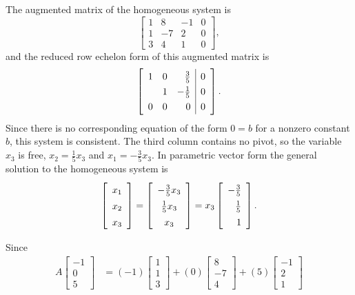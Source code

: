 \begin{example}
\ea 

\ExampleSolution
\ba
\item The augmented matrix of the homogeneous system is 
\[ \left[ \begin{array}{crr|c} 1&8&-1&0 \\ 1&-7&2&0 \\ 3&4&1&0 \end{array} \right],\]
and the reduced row echelon form of this augmented matrix is 
\[ \left[ \renewcommand{\arraystretch}{1.3} \begin{array}{ccr|c} 1&0&\frac{3}{5}&0 \\ &1&-\frac{1}{5}&0 \\ 0&0&0&0 \end{array} \right].\]
Since there is no corresponding equation of the form $0 = b$ for a nonzero constant $b$, this system is consistent. The third column contains no pivot, so the variable $x_3$ is free, $x_2 = \frac{1}{5}x_3$ and $x_1 =  -\frac{3}{5}x_3$.
In parametric vector form the general solution to the homogeneous system is 
\[\left[\begin{array}{c} x_1\\x_2\\x_3 \end{array} \right] = \left[\renewcommand{\arraystretch}{1.4} \begin{array}{c} -\frac{3}{5}x_3\\ \frac{1}{5}x_3\\x_3 \end{array} \right]  = x_3 \left[\renewcommand{\arraystretch}{1.4} \begin{array}{r} -\frac{3}{5}\\ \frac{1}{5}\\1 \end{array} \right].\]
\item  Since
\begin{align*}
A \left[ \begin{array}{r} -1\\0\\5 \end{array} \right] &= (-1)\left[ \begin{array}{c} 1\\1\\3 \end{array} \right] + (0)\left[ \begin{array}{r} 8\\-7\\4 \end{array} \right] + (5) \left[ \begin{array}{r} -1\\2\\1 \end{array} \right] \\

\end{align*}
\end{example}
